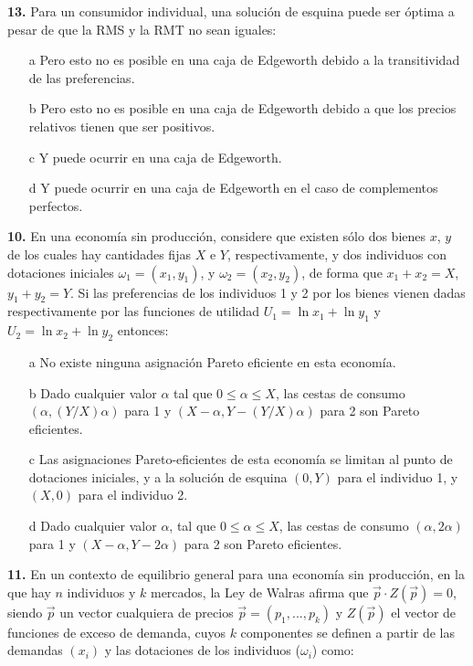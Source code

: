 \documentclass{nuevotema}
\begin{document}

\textbf{13.} Para un consumidor individual, una solución de esquina puede ser óptima a pesar de que la RMS y la RMT no sean iguales:

\begin{itemize}
	\item[a] Pero esto no es posible en una caja de Edgeworth debido a la transitividad de las preferencias.
	\item[b] Pero esto no es posible en una caja de Edgeworth debido a que los precios relativos tienen que ser positivos.
	\item[c] Y puede ocurrir en una caja de Edgeworth.
	\item[d] Y puede ocurrir en una caja de Edgeworth en el caso de complementos perfectos.
\end{itemize}

\textbf{10.} En una economía sin producción, considere que existen sólo dos bienes $x$, $y$ de los cuales hay cantidades fijas $X$ e $Y$, respectivamente, y dos individuos con dotaciones iniciales $\omega_1 = (x_1, y_1)$, y $\omega_2 = (x_2, y_2)$, de forma que $x_1 + x_2 = X$, $y_1 + y_2=Y$. Si las preferencias de los individuos 1 y 2 por los bienes vienen dadas respectivamente por las funciones de utilidad $U_1 = \ln x_1 + \ln y_1$ y $U_2 = \ln x_2 + \ln y_2$ entonces:

\begin{itemize}
	\item[a] No existe ninguna asignación Pareto eficiente en esta economía.
	\item[b] Dado cualquier valor $\alpha$ tal que $0 \leq \alpha \leq X$, las cestas de consumo $(\alpha, (Y/X)\alpha)$ para 1 y $(X-\alpha, Y-(Y/X)\alpha)$ para 2 son Pareto eficientes.
	\item[c] Las asignaciones Pareto-eficientes de esta economía se limitan al punto de dotaciones iniciales, y a la solución de esquina $(0, Y)$ para el individuo 1, y $(X,0)$ para el individuo 2.
	\item[d] Dado cualquier valor $\alpha$, tal que $0 \leq \alpha \leq X$, las cestas de consumo $( \alpha, 2 \alpha )$ para 1 y $(X - \alpha, Y - 2 \alpha)$ para 2 son Pareto eficientes.
\end{itemize}

\textbf{11.} En un contexto de equilibrio general para una economía sin producción, en la que hay $n$ individuos y $k$ mercados, la Ley de Walras afirma que $\vec{p} \cdot Z(\vec{p}) = 0$, siendo $\vec{p}$ un vector cualquiera de precios $\vec{p}=(p_1,...,p_k)$ y $Z(\vec{p})$ el vector de funciones de exceso de demanda, cuyos $k$ componentes se definen a partir de las demandas $(x_i)$ y las dotaciones de los individuos ($\omega_i$) como:
\end{document}
